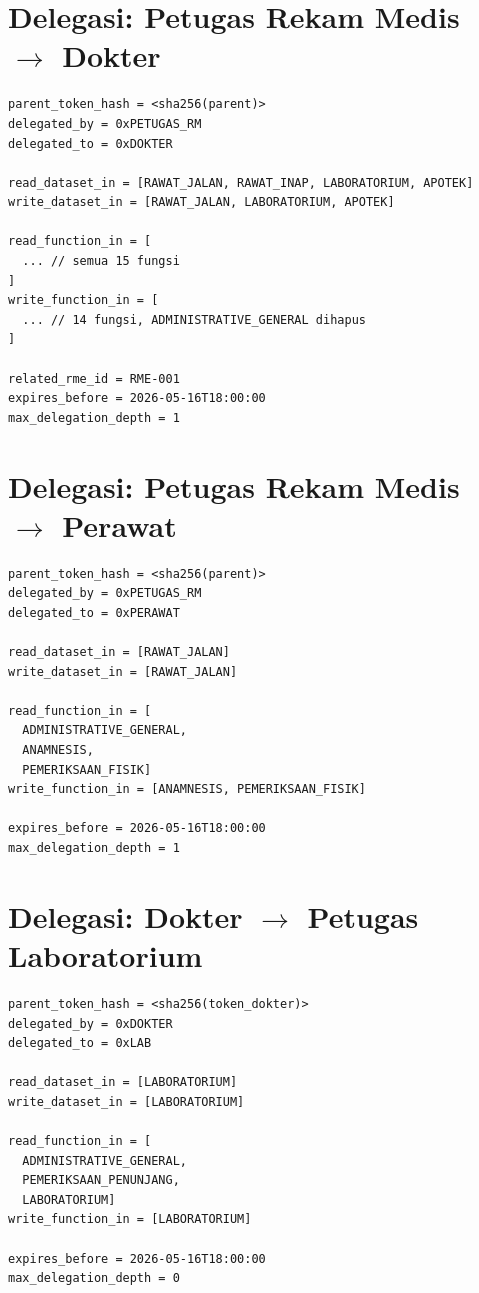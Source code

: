 \section*{Delegasi: Petugas Rekam Medis $\rightarrow$ Dokter}
\label{subsec:contoh-caveat-token-macaroon-delegasi-dokter}

\begin{lstlisting}[caption={Contoh \textit{Caveat} Delegasi Petugas Rekam Medis $\rightarrow$ Dokter}, label={lst:contoh-token-delegasi-dokter}]
parent_token_hash = <sha256(parent)>
delegated_by = 0xPETUGAS_RM
delegated_to = 0xDOKTER

read_dataset_in = [RAWAT_JALAN, RAWAT_INAP, LABORATORIUM, APOTEK]
write_dataset_in = [RAWAT_JALAN, LABORATORIUM, APOTEK]

read_function_in = [
  ... // semua 15 fungsi
]
write_function_in = [
  ... // 14 fungsi, ADMINISTRATIVE_GENERAL dihapus
]

related_rme_id = RME-001
expires_before = 2026-05-16T18:00:00
max_delegation_depth = 1
\end{lstlisting}

\section*{Delegasi: Petugas Rekam Medis $\rightarrow$ Perawat}
\label{subsec:contoh-caveat-token-macaroon-delegasi-perawat}

\begin{lstlisting}[caption={Contoh \textit{Caveat} Delegasi Petugas Rekam Medis $\rightarrow$ Perawat}, label={lst:contoh-token-delegasi-perawat}]
parent_token_hash = <sha256(parent)>
delegated_by = 0xPETUGAS_RM
delegated_to = 0xPERAWAT

read_dataset_in = [RAWAT_JALAN]
write_dataset_in = [RAWAT_JALAN]

read_function_in = [
  ADMINISTRATIVE_GENERAL, 
  ANAMNESIS, 
  PEMERIKSAAN_FISIK]
write_function_in = [ANAMNESIS, PEMERIKSAAN_FISIK]

expires_before = 2026-05-16T18:00:00
max_delegation_depth = 1
\end{lstlisting}

\section*{Delegasi: Dokter $\rightarrow$ Petugas Laboratorium}
\label{subsec:contoh-caveat-token-macaroon-delegasi-lab}

\begin{lstlisting}[caption={Contoh \textit{Caveat} Delegasi Dokter $\rightarrow$ Petugas Laboratorium}, label={lst:contoh-token-delegasi-lab}]
parent_token_hash = <sha256(token_dokter)>
delegated_by = 0xDOKTER
delegated_to = 0xLAB

read_dataset_in = [LABORATORIUM]
write_dataset_in = [LABORATORIUM]

read_function_in = [
  ADMINISTRATIVE_GENERAL, 
  PEMERIKSAAN_PENUNJANG, 
  LABORATORIUM]
write_function_in = [LABORATORIUM]

expires_before = 2026-05-16T18:00:00
max_delegation_depth = 0
\end{lstlisting}

